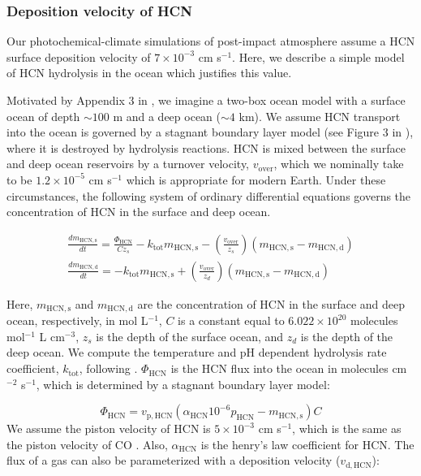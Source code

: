 \subsubsection{Deposition velocity of HCN} \label{sec:hcn_vdep}

Our photochemical-climate simulations of post-impact atmosphere assume a HCN surface deposition velocity of $7 \times 10^{-3}$ cm s$^{-1}$. Here, we describe a simple model of HCN hydrolysis in the ocean which justifies this value.

Motivated by Appendix 3 in \citet{Kharecha_2005}, we imagine a two-box ocean model with a surface ocean of depth $\sim 100$ m and a deep ocean ($\sim 4$ km). We assume HCN transport into the ocean is governed by a stagnant boundary layer model (see Figure 3 in \citet{Kharecha_2005}), where it is destroyed by hydrolysis reactions. HCN is mixed between the surface and deep ocean reservoirs by a turnover velocity, $v_\text{over}$, which we nominally take to be $1.2 \times 10^{-5}$ cm s$^{-1}$ which is appropriate for modern Earth. Under these circumstances, the following system of ordinary differential equations governs the concentration of HCN in the surface and deep ocean.

\begin{gather}
  \frac{d m_\mathrm{HCN,s}}{dt} = \frac{\Phi_\mathrm{HCN}}{C z_s} - k_\mathrm{tot} m_\mathrm{HCN,s} - \left(\frac{v_\mathrm{over}}{z_s}\right)(m_\mathrm{HCN,s} - m_\mathrm{HCN,d}) \label{eq:hydro1}
  \\
  \frac{d m_\mathrm{HCN,d}}{dt} = - k_\mathrm{tot} m_\mathrm{HCN,s} + \left(\frac{v_\mathrm{over}}{z_d}\right)(m_\mathrm{HCN,s} - m_\mathrm{HCN,d}) \label{eq:hydro2}
\end{gather}

Here, $m_\mathrm{HCN,s}$ and $m_\mathrm{HCN,d}$ are the concentration of HCN in the surface and deep ocean, respectively, in mol L$^{-1}$, $C$ is a constant equal to $6.022 \times 10^{20}$ molecules mol$^{-1}$ L cm$^{-3}$, $z_s$ is the depth of the surface ocean, and $z_d$ is the depth of the deep ocean. We compute the temperature and pH dependent hydrolysis rate coefficient, $k_\mathrm{tot}$, following \citet{Miyakawa_2002}. $\Phi_\mathrm{HCN}$ is the HCN flux into the ocean in molecules cm$^{-2}$ s$^{-1}$, which is determined by a stagnant boundary layer model:

\begin{equation} \label{eq:flux_lid}
  \Phi_\mathrm{HCN} = v_\mathrm{p,HCN} (\alpha_\mathrm{HCN} 10^{-6} p_\mathrm{HCN} - m_\mathrm{HCN,s}) C
\end{equation}
We assume the piston velocity of HCN is $5 \times 10^{-3}$ cm s$^{-1}$, which is the same as the piston velocity of CO \citep[Table 1]{Kharecha_2005}. Also, $\alpha_\mathrm{HCN}$ is the henry's law coefficient for HCN. The flux of a gas can also be parameterized with a deposition velocity ($v_\mathrm{d,HCN}$):

